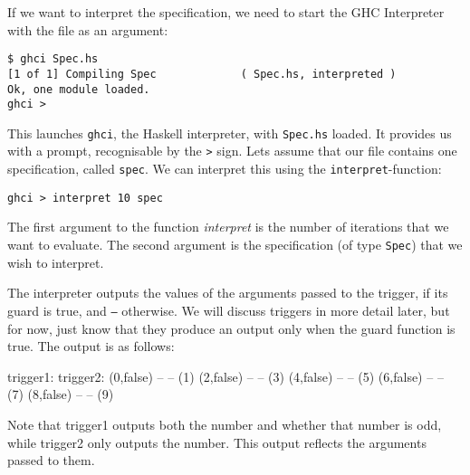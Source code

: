 If we want to interpret the specification, we need to start the GHC Interpreter with the file as an argument:
%
\begin{lstlisting}
$ ghci Spec.hs
[1 of 1] Compiling Spec             ( Spec.hs, interpreted )
Ok, one module loaded.
ghci > 
\end{lstlisting}
%
This launches \texttt{ghci}, the Haskell interpreter, with \texttt{Spec.hs}
loaded. It provides us with a prompt, recognisable by the \texttt{>} sign. Lets
assume that our file contains one specification, called \texttt{spec}. We can
interpret this using the \texttt{interpret}-function:
\begin{lstlisting}[language = Copilot]
ghci > interpret 10 spec
\end{lstlisting}
%
The first argument to the function \emph{interpret} is the number of iterations
that we want to evaluate. The second argument is the specification (of type
{\tt Spec}) that we wish to interpret.

The interpreter outputs the values of the arguments passed to the trigger, if
its guard is true, and {\tt --} otherwise. We will discuss triggers in more
detail later, but for now, just know that they produce an output only when the
guard function is true. The output is as follows:
%
\begin{code}
trigger1:   trigger2:
(0,false)  --
--         (1)
(2,false)  --
--         (3)
(4,false)  --
--         (5)
(6,false)  --
--         (7)
(8,false)  --
--         (9)
\end{code}
%

Note that trigger1 outputs both the number and whether that number is odd,
while trigger2 only outputs the number. This output reflects the arguments
	passed to them. 


